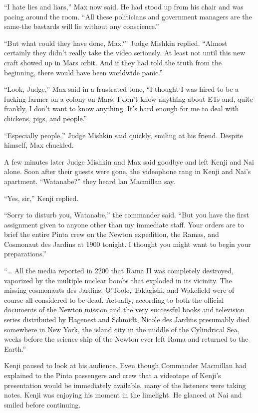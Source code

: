 \documentclass[]{article}
\begin{document}
{“I hate lies and liars,” Max now said. He had stood up from his chair and was pacing around the room. “All these politicians and government managers are the same-the bastards will lie without any conscience.”

“But what could they have done, Max?” Judge Mishkin replied. “Almost certainly they didn’t really take the video seriously. At least not until this new craft showed up in Mars orbit. And if they had told the truth from the beginning, there would have been worldwide panic.”

“Look, Judge,” Max said in a frustrated tone, “I thought I was hired to be a fucking farmer on a colony on Mars. I don’t know anything about ETs and, quite frankly, I don’t want to know anything. It’s hard enough for me to deal with chickens, pigs, and people.”

“Especially people,” Judge Mishkin said quickly, smiling at his friend. Despite himself, Max chuckled.

A few minutes later Judge Mishkin and Max said goodbye and left Kenji and Nai alone. Soon after their guests were gone, the videophone rang in Kenji and Nai’s apartment. “Watanabe?” they heard lan Macmillan say.

“Yes, sir,” Kenji replied.

“Sorry to disturb you, Watanabe,” the commander said. “But you have the first assignment given to anyone other than my immediate staff. Your orders are to brief the entire Pinta crew on the Newton expedition, the Ramas, and Cosmonaut des Jardins at 1900 tonight. I thought you might want to begin your preparations.”

“… All the media reported in 2200 that Rama II was completely destroyed, vaporized by the multiple nuclear bombs that exploded in its vicinity. The missing cosmonauts des Jardins, O’Toole, Takagishi, and Wakefield were of course all considered to be dead. Actually, according to both the official documents of the Newton mission and the very successful books and television series distributed by Hagenest and Schmidt, Nicole des Jardins presumably died somewhere in New York, the island city in the middle of the Cylindrical Sea, weeks before the science ship of the Newton ever left Rama and returned to the Earth.”

Kenji paused to look at his audience. Even though Commander Macmillan had explained to the Pinta passengers and crew that a videotape of Kenji’s presentation would be immediately available, many of the listeners were taking notes. Kenji was enjoying his moment in the limelight. He glanced at Nai and smiled before continuing.

}
\end{document}
